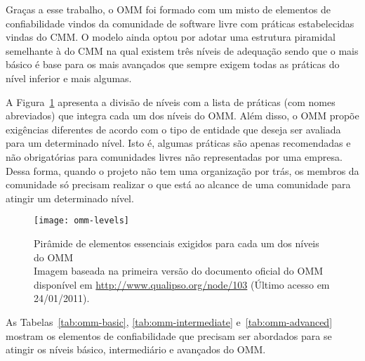 Graças a esse trabalho, o OMM foi formado com um misto de elementos de
confiabilidade vindos da comunidade de software livre com práticas
estabelecidas vindas do CMM. O modelo ainda optou por adotar uma
estrutura piramidal semelhante à do CMM na qual existem três níveis de
adequação sendo que o mais básico é base para os mais avançados que
sempre exigem todas as práticas do nível inferior e mais algumas.

A Figura~\ref{fig:piramide-omm} apresenta a divisão de níveis com a
lista de práticas (com nomes abreviados) que integra cada um dos
níveis do OMM. Além disso, o OMM propõe exigências diferentes de
acordo com o tipo de entidade que deseja ser avaliada para um
determinado nível. Isto é, algumas práticas são apenas recomendadas e
não obrigatórias para comunidades livres não representadas por uma
empresa. Dessa forma, quando o projeto não tem uma organização por
trás, os membros da comunidade só precisam realizar o que está ao
alcance de uma comunidade para atingir um determinado nível.

\begin{figure}
  \centering
  \texttt{[image: omm-levels]}
  \caption{Pirâmide de elementos essenciais exigidos para cada um dos
    níveis do OMM\\
    Imagem baseada na primeira versão do documento oficial do OMM
    disponível em \url{http://www.qualipso.org/node/103} (Último
    acesso em 24/01/2011).}
  \label{fig:piramide-omm}
\end{figure}

As Tabelas~\ref{tab:omm-basic}, \ref{tab:omm-intermediate}
e~\ref{tab:omm-advanced} mostram os elementos de confiabilidade que
precisam ser abordados para se atingir os níveis básico, intermediário
e avançados do OMM.

